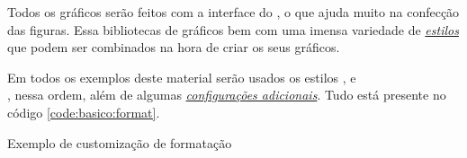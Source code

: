 Todos os gráficos serão feitos com a interface \pyplot do \matplotlib, o que ajuda muito na confecção das figuras. Essa bibliotecas de gráficos bem com uma imensa variedade de \href{https://matplotlib.org/3.1.0/gallery/style_sheets/style_sheets_reference.html}{\emph{estilos}} que podem ser combinados na hora de criar os seus gráficos.

Em todos os exemplos deste material serão usados os estilos ,  e \\, nessa ordem, além de algumas \href{https://matplotlib.org/users/customizing.html}{\emph{configurações adicionais}}. Tudo está presente no código \ref{code:basico:format}.

\begin{listing}[H]
    \caption{Exemplo de customização de formatação}
    \label{code:basico:format}

\end{listing}
